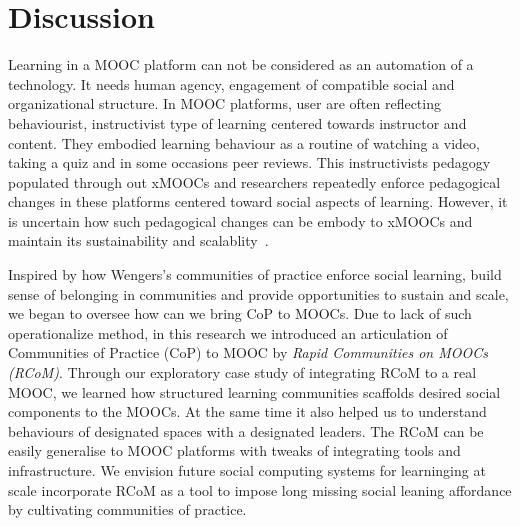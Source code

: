 \documentclass[format=acmsmall, review=false, screen=true]{acmart}
\newcommand{\msb}[1]{{\textcolor{blue}{ [Michael: #1]}}}
\newcommand{\dil}[1]{{\textcolor{magenta}{ Dilrukshi: #1]}}}
\begin{document}


\section{Discussion}

Learning in a MOOC platform can not be considered as an automation of a technology. It needs human agency, engagement of compatible social and organizational structure. In MOOC platforms, user are often reflecting behaviourist, instructivist type of learning centered towards instructor and content. They embodied learning behaviour as a routine of watching a video, taking a quiz and in some occasions peer reviews. This instructivists pedagogy populated through out xMOOCs and researchers repeatedly enforce pedagogical changes in these platforms centered toward social aspects of learning. However, it is uncertain how such pedagogical changes can be embody to xMOOCs and maintain its sustainability and scalablity~\cite{law2019sociotechnical,looi2015scaling}. 

Inspired by how Wengers's communities of practice enforce social learning, build sense of belonging in communities and provide opportunities to sustain and scale, we began to oversee how can we bring CoP to MOOCs. Due to lack of such operationalize method, in this research we introduced an articulation of Communities of Practice (CoP) to MOOC by \textit{Rapid Communities on MOOCs (RCoM)}. Through our exploratory case study of integrating RCoM to a real MOOC, we learned how structured learning communities scaffolds desired social components to the MOOCs. At the same time it also helped us to understand behaviours of designated spaces with a designated leaders. The RCoM can be easily generalise to MOOC platforms with tweaks of integrating tools and infrastructure. We envision future social computing systems for learninging at scale incorporate RCoM as a tool to impose long missing social leaning affordance by cultivating communities of practice. 
\end{document}
